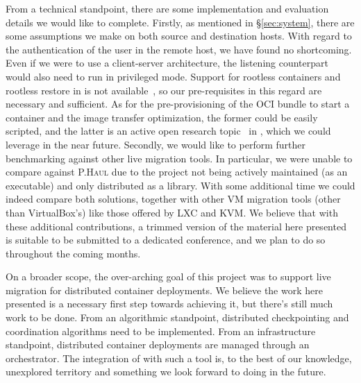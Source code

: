 From a technical standpoint, there are some implementation and evaluation details we would like to complete.
Firstly, as mentioned in \S\ref{sec:system}, there are some assumptions we make on both source and destination hosts.
With regard to the authentication of the user in the remote host, we have found no shortcoming.
Even if we were to use a client-server architecture, the listening counterpart would also need to run in privileged mode.
Support for rootless containers and rootless restore in \criu is not available~\cite{criu-rootless1,criu-rootless2}, so our pre-requisites in this regard are necessary and sufficient.
As for the pre-provisioning of the OCI bundle to start a \runc container and the image transfer optimization, the former could be easily scripted, and the latter is an active open research topic~\cite{criu-image-streamer} in \criu, which we could leverage in the near future.
Secondly, we would like to perform further benchmarking against other live migration tools.
In particular, we were unable to compare against \textsc{P.Haul} due to the project not being actively maintained (as an executable) and only distributed as a library.
With some additional time we could indeed compare both solutions, together with other VM migration tools (other than VirtualBox's) like those offered by LXC and KVM.
We believe that with these additional contributions, a trimmed version of the material here presented is suitable to be submitted to a dedicated conference, and we plan to do so throughout the coming months.

On a broader scope, the over-arching goal of this project was to support live migration for distributed container deployments.
We believe the work here presented is a necessary first step towards achieving it, but there's still much work to be done.
From an algorithmic standpoint, distributed checkpointing and coordination algorithms need to be implemented.
From an infrastructure standpoint, distributed container deployments are managed through an orchestrator.
The integration of \criu with such a tool is, to the best of our knowledge, unexplored territory and something we look forward to doing in the future.
